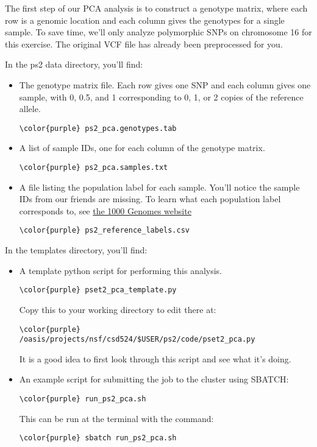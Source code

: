 \documentclass[12pt]{article}
\begin{document}
The first step of our PCA analysis is to construct a genotype matrix, where each row is a genomic location and each column gives the genotypes for a single sample. To save time, we'll only analyze polymorphic SNPs on chromosome 16 for this exercise. The original VCF file has already been preprocessed for you.

In the ps2 data directory, you'll find:

\begin{itemize}
\item The genotype matrix file. Each row gives one SNP and each column gives one sample, with 0, 0.5, and 1 corresponding to 0, 1, or 2 copies of the reference allele. 
\begin{Verbatim}[commandchars=\\\{\}]
\color{purple} ps2_pca.genotypes.tab
\end{Verbatim}
\item A list of sample IDs, one for each column of the genotype matrix.
\begin{Verbatim}[commandchars=\\\{\}]
\color{purple} ps2_pca.samples.txt
\end{Verbatim}
\item A file listing the population label for each sample. You'll notice the sample IDs from our friends are missing. To learn what each population label corresponds to, see \href{http://www.internationalgenome.org/category/population/}{the 1000 Genomes website}
\begin{Verbatim}[commandchars=\\\{\}]
\color{purple} ps2_reference_labels.csv
\end{Verbatim}
\end{itemize}

In the templates directory, you'll find:
\begin{itemize}
\item A template python script for performing this analysis.
\begin{Verbatim}[commandchars=\\\{\}]
\color{purple} pset2_pca_template.py
\end{Verbatim}
Copy this to your working directory to edit there at:
\begin{Verbatim}[commandchars=\\\{\}]
\color{purple} /oasis/projects/nsf/csd524/$USER/ps2/code/pset2_pca.py
\end{Verbatim}
It is a good idea to first look through this script and see what it's doing.

\item An example script for submitting the job to the cluster using SBATCH:
\begin{Verbatim}[commandchars=\\\{\}]
\color{purple} run_ps2_pca.sh
\end{Verbatim}

This can be run at the terminal with the command:
\begin{Verbatim}[commandchars=\\\{\}]
\color{purple} sbatch run_ps2_pca.sh
\end{Verbatim}
\end{itemize}
\end{document}
